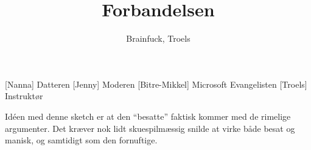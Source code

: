 \documentclass[a4paper,11pt]{article}
\title{Forbandelsen}
\author{Brainfuck, Troels}
\begin{document}
\maketitle

\begin{roles}
  [Nanna] Datteren
  [Jenny] Moderen
  [Bitre-Mikkel] Microsoft Evangelisten
  [Troels] Instruktør
\end{roles}

\begin{props}
\end{props}

Idéen med denne sketch er at den ``besatte'' faktisk kommer med de
rimelige argumenter.  Det kræver nok lidt skuespilmæssig snilde at
virke både besat og manisk, og samtidigt som den fornuftige.
\end{document}

